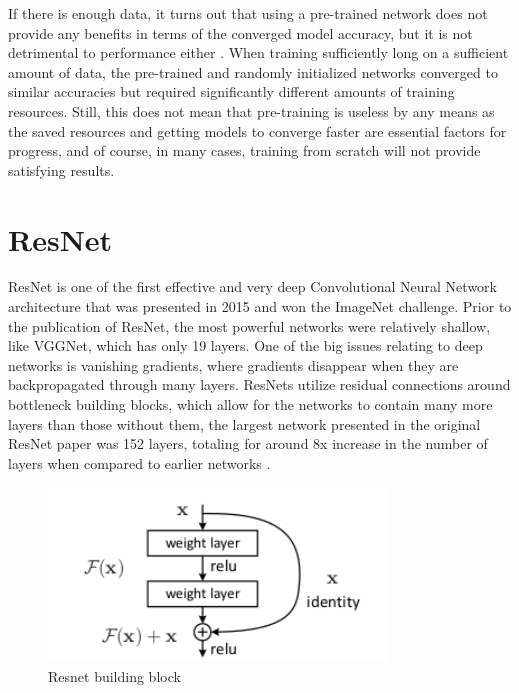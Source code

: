 If there is enough data, it turns out that using a pre-trained network does not provide any benefits in terms of the converged model accuracy, but it is not detrimental to performance either \citep{rethinkTransfer}. When training sufficiently long on a sufficient amount of data, the pre-trained and randomly initialized networks converged to similar accuracies but required significantly different amounts of training resources. Still, this does not mean that pre-training is useless by any means as the saved resources and getting models to converge faster are essential factors for progress, and of course, in many cases, training from scratch will not provide satisfying results.

\section{ResNet}
ResNet is one of the first effective and very deep Convolutional Neural Network architecture that was presented in 2015 and won the ImageNet challenge. Prior to the publication of ResNet, the most powerful networks were relatively shallow, like VGGNet, which has only 19 layers. One of the big issues relating to deep networks is vanishing gradients, where gradients disappear when they are backpropagated through many layers. ResNets utilize residual connections around bottleneck building blocks, which allow for the networks to contain many more layers than those without them, the largest network presented in the original ResNet paper was 152 layers, totaling for around 8x increase in the number of layers when compared to earlier networks \citep{resNet}.

\begin{figure}[h!] 
\centering 
\includegraphics[width=0.8\textwidth]{imgs/resnet-block.png}
\caption{Resnet building block \citep{resNet}}
\end{figure}

